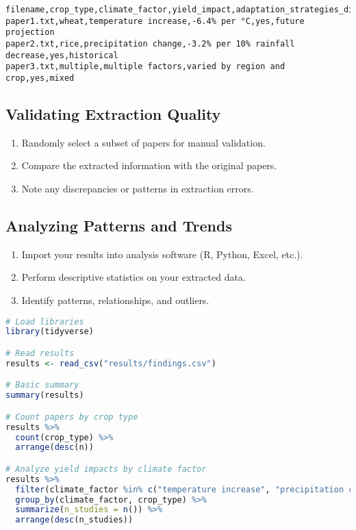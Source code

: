 \begin{infobox}
\begin{lstlisting}
filename,crop_type,climate_factor,yield_impact,adaptation_strategies_discussed,study_timeframe
paper1.txt,wheat,temperature increase,-6.4% per °C,yes,future projection
paper2.txt,rice,precipitation change,-3.2% per 10% rainfall decrease,yes,historical
paper3.txt,multiple,multiple factors,varied by region and crop,yes,mixed
\end{lstlisting}
\end{infobox}


\subsection{Validating Extraction Quality}

\begin{enumerate}
    \item Randomly select a subset of papers for manual validation.
    \item Compare the extracted information with the original papers.

    \item Note any discrepancies or patterns in extraction errors.
\end{enumerate}

\subsection{Analyzing Patterns and Trends}

\begin{enumerate}
    \item Import your results into analysis software (R, Python, Excel, etc.).
    \item Perform descriptive statistics on your extracted data.
    \item Identify patterns, relationships, and outliers.
\end{enumerate}

\begin{commandbox}
\begin{lstlisting}[language=R]
# Load libraries
library(tidyverse)

# Read results
results <- read_csv("results/findings.csv")

# Basic summary
summary(results)

# Count papers by crop type
results %>%
  count(crop_type) %>%
  arrange(desc(n))

# Analyze yield impacts by climate factor
results %>%
  filter(climate_factor %in% c("temperature increase", "precipitation change")) %>%
  group_by(climate_factor, crop_type) %>%
  summarize(n_studies = n()) %>%
  arrange(desc(n_studies))
\end{lstlisting}
\end{commandbox}


